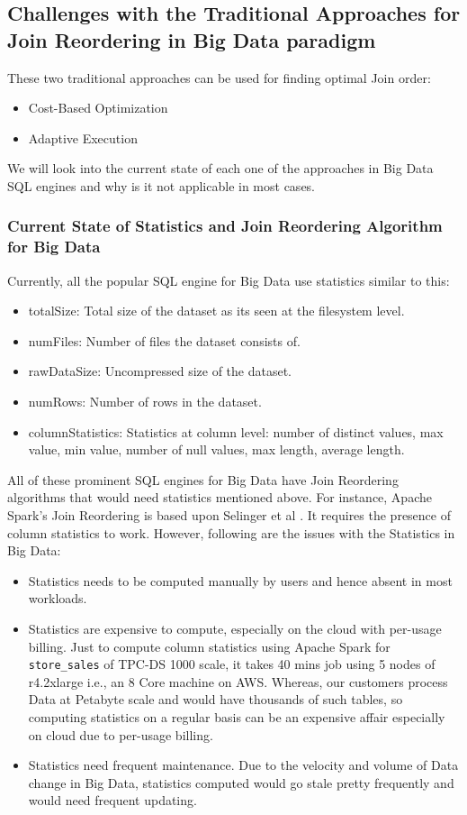 \subsection{Challenges with the Traditional Approaches for Join Reordering in Big Data paradigm}
These two traditional approaches can be used for finding optimal Join order:
\begin{itemize}
\item Cost-Based Optimization
\item Adaptive Execution
\end{itemize}

We will look into the current state of each one of the approaches in Big Data SQL engines and why is it not applicable in most cases.

\subsubsection{Current State of Statistics and Join Reordering Algorithm for Big Data}

Currently, all the popular SQL engine for Big Data use statistics similar to this:
\begin{itemize}
\item totalSize: Total size of the dataset as its seen at the filesystem level.
\item numFiles: Number of files the dataset consists of.
\item rawDataSize: Uncompressed size of the dataset.
\item numRows: Number of rows in the dataset.
\item columnStatistics: Statistics at column level: number of distinct values, max value, min value, number of null values, max length, average length.
\end{itemize}

All of these prominent SQL engines for Big Data have Join Reordering algorithms that would need statistics mentioned above. For instance, Apache Spark's Join Reordering is based upon Selinger et al \cite{b1}. It requires the presence of column statistics to work. However, following are the issues with the Statistics in Big Data:

\begin{itemize}
\item Statistics needs to be computed manually by users and hence absent in most workloads.
\item Statistics are expensive to compute, especially on the cloud with per-usage billing. Just to compute column statistics using Apache Spark for  \texttt{store\_sales} of TPC-DS 1000 scale, it takes 40 mins job using 5 nodes of r4.2xlarge i.e., an 8 Core machine on AWS. Whereas, our customers process Data at Petabyte scale and would have thousands of such tables, so computing statistics on a regular basis can be an expensive affair especially on cloud due to per-usage billing.
\item Statistics need frequent maintenance. Due to the velocity and volume of Data change in Big Data, statistics computed would go stale pretty frequently and would need frequent updating.
\end{itemize}

